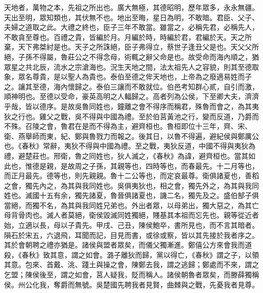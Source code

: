 天地者，萬物之本，先祖之所出也。廣大無極，其德昭明，歷年眾多，永永無疆。天出至明，眾知類也，其伏無不也。地出至晦，星日為明，不敢暗。君臣、父子、夫婦之道取之此。大禮之終也，臣子三年不敢當。雖當之，必稱先君，必稱先人，不敢貪至尊也。百禮之貴，皆編於月。月編於時，時編於君，君編於天。天之所棄，天下弗桀紂是也。天子之所誅絕，臣子弗得立，蔡世子逢丑父是也。天父父所絕，子孫不得屬，魯莊公之不得念母，術輒之辭父命是也。故受命而海內順之，猶眾星之共北辰，流水之宗滄海也。況生天地之間，法太祖先人之容貌，則其至德取象，眾名尊貴，是以聖人為貴也。泰伯至德之侔天地也，上帝為之廢適易姓而子之。讓其至德，海內懷歸之。泰伯三讓而不敢就位。伯邑考知群心貳，自引而激，順神明也。至德以受命，豪英高明之人輻歸之。高者列為公侯，下至卿大夫，濟濟乎哉，皆以德序。是故吳魯同姓也，鐘離之會不得序而稱君，殊魯而會之，為其夷狄之行也。雞父之戰，吳不得與中國為禮。至於伯莒黃池之行，變而反道，乃爵而不殊。召陵之會，魯君在是而不得為主，避齊桓也。魯桓即位十三年，齊、宋、衛、燕舉師而東，紀、鄭與魯戮力而報之。後其日，以魯不得遍，避紀侯與鄭厲公也。《春秋》常辭，夷狄不得與中國為禮。至之戰，夷狄反道，中國不得與夷狄為禮，避楚莊也。邢衛，魯之同姓也，狄人滅之，《春秋》為諱，避齊桓也。當其如此也，惟德是親，是故周之子孫，其親等也，四時等也，而春最先。十二月等也，而正月最先。德等也，則先親親。魯十二公等也，而定哀最尊。衛俱諸夏也，善稻之會，獨先內之，為其與我同姓也。吳俱夷狄也，相之會，獨先外之，為其與我同姓也。滅國十五有余，獨先諸夏，魯晉俱諸夏也，譏二名，獨先及之。盛伯郜子俱當絕，而獨不名，為其與我同姓兄弟也。外出者眾，以母弟出，獨大惡之，為其亡母背骨肉也。滅人者莫絕，衛侯毀滅同姓獨絕，賤基其本祖而忘先也。親等從近者始，立適以長，母以子貴先。甲戌、己丑，陳侯鮑卒，書所見也，而不言其暗者。隕石於宋五，六退飛，耳聞而記，目見而書，或徐或察，皆以其先接於我者序之。其於會朝聘之禮亦猶是。諸侯與盟者眾矣，而儀父獨漸進。鄭僖公方來會我而道殺，《春秋》致其意，謂之如會。潞子離狄而歸，黨以得亡，《春秋》謂之子，以領其意。包來、首戴、洮、踐土與操之會，陳鄭去我，謂之逃歸；鄭處而不來，謂之乞盟；陳侯後至，謂之如會，莒人疑我，貶而稱人。諸侯朝魯者眾矣，而滕薛獨稱侯。州公化我，奪爵而無號。吳楚國先聘我者見賢，曲棘與之戰，先憂我者見尊。


